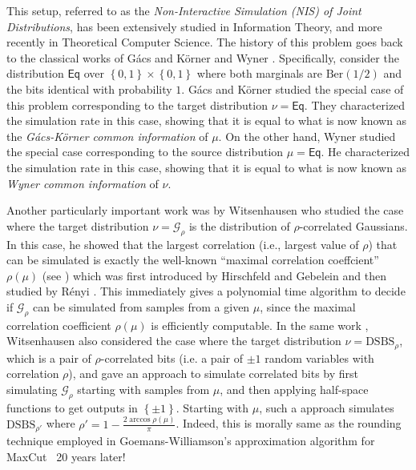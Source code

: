 \documentclass[11pt]{article}
\newcommand{\inbrace}[1]{\left \{ #1 \right \}}
\newcommand{\set}[1]{\inbrace{#1}}
\newcommand{\DSBS}{\mathrm{DSBS}}
\newcommand{\bit}{\set{0,1}}
\newcommand{\calG}{\mathcal{G}}
\newcommand{\Ber}{\mathrm{Ber}}
\begin{document}
This setup, referred to as the \emph{Non-Interactive Simulation (NIS) of Joint Distributions}, has been extensively studied in Information Theory, and more recently in Theoretical Computer Science. The history of this problem goes back to the classical works of G\'acs and K\"orner \cite{gacs1973common} and Wyner \cite{Wyner_CommonInfo}. Specifically, consider the distribution $\mathsf{Eq}$ over $\bit \times \bit$ where both marginals are $\Ber(1/2)$ and the bits identical with probability $1$. G\'acs and K\"orner studied the special case of this problem corresponding to the target distribution $\nu = \mathsf{Eq}$. They characterized the simulation rate in this case, showing that it is equal to what is now known as the {\em G\'acs-K\"orner common information} of $\mu$. On the other hand, Wyner studied the special case corresponding to the source distribution $\mu = \mathsf{Eq}$. He characterized the simulation rate in this case, showing that it is equal to what is now known as {\em Wyner common information} of $\nu$.

Another particularly important work was by Witsenhausen \cite{witsenhausen1975sequences} who studied the case where the target distribution $\nu = \calG_{\rho}$ is the distribution of $\rho$-correlated Gaussians. In this case, he showed that the largest correlation (i.e., largest value of $\rho$) that can be simulated is exactly the well-known ``maximal correlation coeffcient'' $\rho(\mu)$ (see ) which was first introduced by Hirschfeld \cite{hirschfeld1935connection} and Gebelein \cite{gebelein1941statistische} and then studied by R{\'e}nyi \cite{renyi1959measures}. This immediately gives a polynomial time algorithm to decide if $\calG_\rho$ can be simulated from samples from a given $\mu$, since the maximal correlation coefficient $\rho(\mu)$ is efficiently computable. In the same work \cite{witsenhausen1975sequences}, Witsenhausen also considered the case where the target distribution $\nu = \mathrm{DSBS}_\rho$, which is a pair of $\rho$-correlated bits (i.e. a pair of $\pm 1$ random variables with correlation $\rho$), and gave an approach to simulate correlated bits by first simulating $\calG_{\rho}$ starting with samples from $\mu$, and then applying half-space functions to get outputs in $\set{\pm 1}$. Starting with $\mu$, such a approach simulates $\DSBS_{\rho'}$ where $\rho' = 1 - \frac{2\arccos \rho(\mu)}{\pi}$. Indeed, this is morally same as the rounding technique employed in Goemans-Williamson's approximation algorithm for MaxCut~\cite{goemans1995maxcut} 20 years later!
\end{document}

